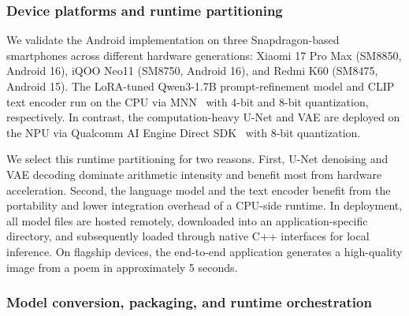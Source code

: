 \subsubsection{Device platforms and runtime partitioning}
We validate the Android implementation on three Snapdragon-based smartphones across different hardware generations: Xiaomi 17 Pro Max (SM8850, Android 16), iQOO Neo11 (SM8750, Android 16), and Redmi K60 (SM8475, Android 15). The LoRA-tuned Qwen3-1.7B prompt-refinement model and CLIP text encoder run on the CPU via MNN~\cite{alibaba2020mnn} with 4-bit and 8-bit quantization, respectively. In contrast, the computation-heavy U-Net and VAE are deployed on the NPU via Qualcomm AI Engine Direct SDK~\cite{qnn} with 8-bit quantization.

We select this runtime partitioning for two reasons. First, U-Net denoising and VAE decoding dominate arithmetic intensity and benefit most from hardware acceleration. Second, the language model and the text encoder benefit from the portability and lower integration overhead of a CPU-side runtime. In deployment, all model files are hosted remotely, downloaded into an application-specific directory, and subsequently loaded through native C++ interfaces for local inference. On flagship devices, the end-to-end application generates a high-quality image from a poem in approximately 5 seconds.

\subsubsection{Model conversion, packaging, and runtime orchestration}



